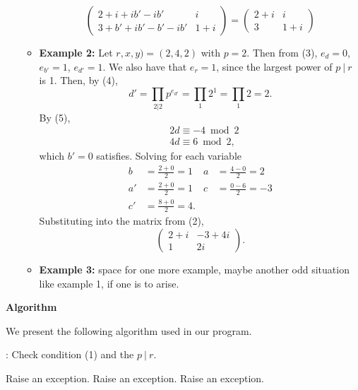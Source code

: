 \documentclass[9pt]{article}
\begin{document}
\begin{itemize}
\begin{itemize}
\begin{equation*}
\begin{pmatrix}
		2 + i + ib' - ib' & i \\
		3 + b' + ib' - b' - ib' & 1 + i
		\end{pmatrix}
		=
		\begin{pmatrix}
		2 + i & i \\
		3 & 1 + i
		\end{pmatrix}
		\end{equation*}
		\item \textbf{Example 2:} Let $r,x,y) = (2,4,2)$ with $p = 2$. Then from (3), $e_d = 0$, $e_{b'} = 1$, $e_{d'} = 1$. We also have that $e_r = 1$, since the largest power of $p~|~r$ is 1. Then, by (4),
		\begin{equation*}
		d' = \prod_{2|2} p^{e_{d'}} = \prod_{1} 2^1 = \prod_{1} 2 = 2.
		\end{equation*}
		By (5),
		\begin{align*}
		& 2d \equiv -4 \bmod 2 \\
		&4d \equiv 6 \bmod 2,
		\end{align*}
		which $b' = 0$ satisfies. Solving for each variable
		\begin{align*}
		b &= \frac{2 + 0}{2} = 1 & a &= \frac{4 - 0}{2} = 2\\
		a' &= \frac{2 + 0}{2} = 1 & c &= \frac{0 - 6}{2} = -3 \\
		c' &= \frac{8 + 0}{2} = 4.
		\end{align*}
		Substituting into the matrix from (2),
		\begin{equation*}
		\begin{pmatrix}
		2 + i & -3 + 4i \\
		1 & 2i
		\end{pmatrix}.
		\end{equation*}
		\item \textbf{Example 3:} space for one more example, maybe another odd situation like example 1, if one is to arise.
	\end{itemize}
\end{itemize}

\clearpage

\Large
\textbf{Algorithm}
\normalsize

We present the following algorithm used in our program.

\begin{algorithm}
    \caption{: Check condition (1) and the $p~|~r$.}
    \label{euclid}
    \begin{algorithmic}[1] %
    	\State Raise an exception.
    \EndIf
		\State Raise an exception.
	\EndIf
    \Else
    	\State Raise an exception.
    \EndIf
    \end{algorithmic}
\end{algorithm}
\end{document}
